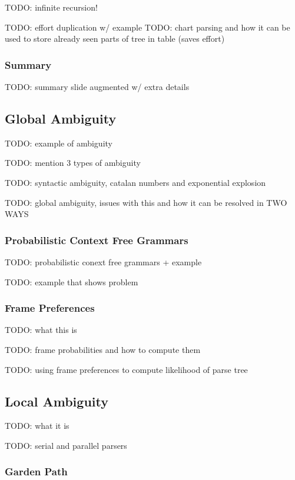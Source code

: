 \documentclass{article}
\begin{document}
TODO: infinite recursion!

TODO: effort duplication w/ example
TODO: chart parsing and how it can be used to store already seen parts of tree in table (saves effort)

\subsubsection{Summary}

TODO: summary slide augmented w/ extra details

\subsection{Global Ambiguity}

TODO: example of ambiguity

TODO: mention 3 types of ambiguity

TODO: syntactic ambiguity, catalan numbers and exponential explosion

TODO: global ambiguity, issues with this and how it can be resolved in TWO WAYS

\subsubsection{Probabilistic Context Free Grammars}

TODO: probabilistic conext free grammars + example

TODO: example that shows problem

\subsubsection{Frame Preferences}

TODO: what this is

TODO: frame probabilities and how to compute them

TODO: using frame preferences to compute likelihood of parse tree

\subsection{Local Ambiguity}

TODO: what it is

TODO: serial and parallel parsers

\subsubsection{Garden Path}
\end{document}
